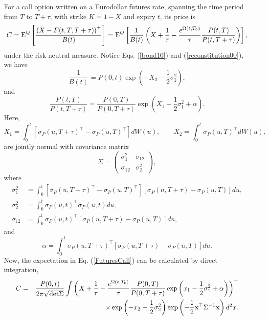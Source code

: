 \documentclass[12pt]{article}
\begin{document}
    For a call option written on a Eurodollar futures rate, spanning the time period from $T$ to $T+\tau$, with strike $K=1-X$ and expiry $t$,
    its price is
    \begin{equation}
      C = {\rm E}^Q\left[\frac{\left(X-F(t,T,T+\tau)\right)^+}{B(t)}\right]
        = {\rm E}^Q\left[\frac{1}{B(t)}\left(X+\frac{1}{\tau}-\frac{e^{\Omega(t,T_0)}}{\tau}\frac{P(t,T)}{P(t,T+\tau)}\right)\right],
      \label{FuturesCall}
    \end{equation}
    under the risk neutral measure. Notice Eqs. (\ref{bond10}) and (\ref{reconstitution00}), we have
    \begin{equation}
      \frac{1}{B(t)} = P(0,t)\exp\left(-X_2-\frac{1}{2}\sigma_2^2\right),
    \end{equation}
    and
    \begin{equation}
      \frac{P(t,T)}{P(t,T+\tau)} = \frac{P(0,T)}{P(0,T+\tau)}\exp\left(X_1-\frac{1}{2}\sigma_1^2+\alpha\right).
    \end{equation}
    Here,
    \begin{equation}
      X_1=\int_0^t\left[\sigma_P(u,T+\tau)^{\top}-\sigma_P(u,T)^{\top}\right]dW(u), \quad\quad X_2=\int_0^t\sigma_P(u,T)^{\top}dW(u),
    \end{equation}
    are jointly normal with covariance matrix
    \begin{equation}
      \Sigma = \left(
        \begin{array}{cc}
          \sigma_1^2 & \sigma_{12} \\
          \sigma_{12} & \sigma_2^2
        \end{array}\right),
    \end{equation}
    where
      \begin{align*}
        \sigma_1^2 &= \int_0^t\left[\sigma_P(u,T+\tau)^{\top}-\sigma_P(u,T)^{\top}\right]\left[\sigma_P(u,T+\tau)-\sigma_P(u,T)\right]du,\\
        \sigma_2^2 &= \int_0^t\sigma_P(u,t)^{\top}\sigma_P(u,t)du,\\
        \sigma_{12} &= \int_0^t\sigma_P(u,t)^{\top}\left[\sigma_P(u,T+\tau)-\sigma_P(u,T)\right]du,
      \end{align*}
    and
    \begin{equation}
      \alpha = \int_0^t\sigma_P(u,T+\tau)^{\top}\left[\sigma_P(u,T+\tau)-\sigma_P(u,T)\right]du.
    \end{equation}
    Now, the expectation in Eq. (\ref{FuturesCall}) can be calculated by direct integration,
    \begin{eqnarray}
      C &=& \frac{P(0,t)}{2\pi\sqrt{{\rm det}\Sigma}}\int\left(X+\frac{1}{\tau}-\frac{e^{\Omega(t,T_0)}}{\tau}
                \frac{P(0,T)}{P(0,T+\tau)}\exp\left(x_1-\frac{1}{2}\sigma_1^2+\alpha\right)\right)^+ \nonumber\\
                && \quad\quad\quad\quad\times
                    \exp\left(-x_2-\frac{1}{2}\sigma_2^2\right)\exp\left(-\frac{1}{2}{\bf x}^{\top}\Sigma^{-1}{\bf x}\right)d^2x.
    \end{eqnarray}
\end{document}
